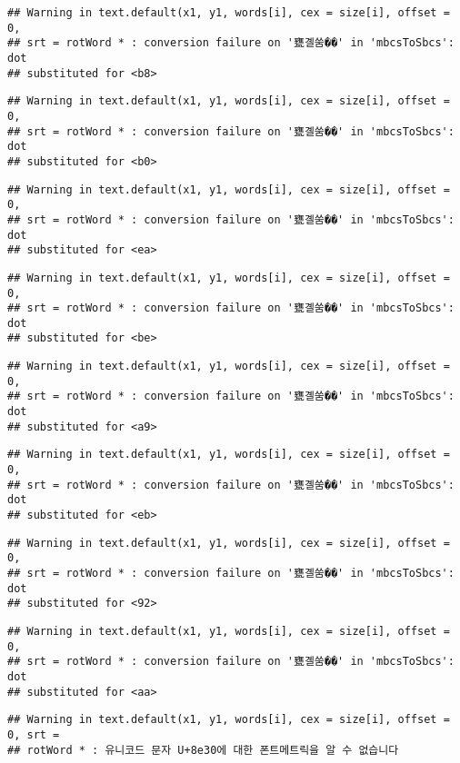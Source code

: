 \documentclass[]{article}
\begin{document}
\begin{verbatim}
## Warning in text.default(x1, y1, words[i], cex = size[i], offset = 0,
## srt = rotWord * : conversion failure on '甕곌쑴��' in 'mbcsToSbcs': dot
## substituted for <b8>
\end{verbatim}

\begin{verbatim}
## Warning in text.default(x1, y1, words[i], cex = size[i], offset = 0,
## srt = rotWord * : conversion failure on '甕곌쑴��' in 'mbcsToSbcs': dot
## substituted for <b0>
\end{verbatim}

\begin{verbatim}
## Warning in text.default(x1, y1, words[i], cex = size[i], offset = 0,
## srt = rotWord * : conversion failure on '甕곌쑴��' in 'mbcsToSbcs': dot
## substituted for <ea>
\end{verbatim}

\begin{verbatim}
## Warning in text.default(x1, y1, words[i], cex = size[i], offset = 0,
## srt = rotWord * : conversion failure on '甕곌쑴��' in 'mbcsToSbcs': dot
## substituted for <be>
\end{verbatim}

\begin{verbatim}
## Warning in text.default(x1, y1, words[i], cex = size[i], offset = 0,
## srt = rotWord * : conversion failure on '甕곌쑴��' in 'mbcsToSbcs': dot
## substituted for <a9>
\end{verbatim}

\begin{verbatim}
## Warning in text.default(x1, y1, words[i], cex = size[i], offset = 0,
## srt = rotWord * : conversion failure on '甕곌쑴��' in 'mbcsToSbcs': dot
## substituted for <eb>
\end{verbatim}

\begin{verbatim}
## Warning in text.default(x1, y1, words[i], cex = size[i], offset = 0,
## srt = rotWord * : conversion failure on '甕곌쑴��' in 'mbcsToSbcs': dot
## substituted for <92>
\end{verbatim}

\begin{verbatim}
## Warning in text.default(x1, y1, words[i], cex = size[i], offset = 0,
## srt = rotWord * : conversion failure on '甕곌쑴��' in 'mbcsToSbcs': dot
## substituted for <aa>
\end{verbatim}

\begin{verbatim}
## Warning in text.default(x1, y1, words[i], cex = size[i], offset = 0, srt =
## rotWord * : 유니코드 문자 U+8e30에 대한 폰트메트릭을 알 수 없습니다
\end{verbatim}
\end{document}
